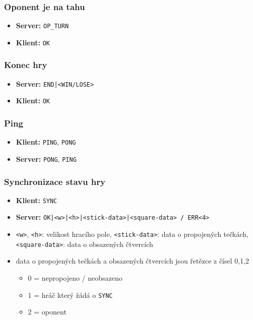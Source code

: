 \documentclass[11pt,a4paper]{article}
\begin{document}
\subsubsection*{Oponent je na tahu}
\begin{itemize}
	\item \textbf{Server:} \texttt{OP\_TURN}
	\item \textbf{Klient:} \texttt{OK}
\end{itemize}

\subsubsection*{Konec hry}
\begin{itemize}
	\item \textbf{Server:} \texttt{END|<WIN/LOSE>}
	\item \textbf{Klient:} \texttt{OK}
\end{itemize}

\subsubsection*{Ping}
\begin{itemize}
	\item \textbf{Klient:} \texttt{PING}, \texttt{PONG}
	\item \textbf{Server:} \texttt{PONG}, \texttt{PING}
\end{itemize}

\subsubsection*{Synchronizace stavu hry}
\begin{itemize}
	\item \textbf{Klient:} \texttt{SYNC}
	\item \textbf{Server:} \texttt{OK|<w>|<h>|<stick-data>|<square-data> / ERR<4>}
	\item \texttt{<w>}, \texttt{<h>}: velikost hracího pole, \texttt{<stick-data>}: data o propojených tečkách, \texttt{<square-data>}: data o obsazených čtvercích
	\item data o propojených tečkách a obsazených čtvercích jsou řetězce z čísel 0,1,2
	\begin{itemize}
		\item 0 = nepropojeno / neobsazeno
		\item 1 = hráč který žádá o \texttt{SYNC}
		\item 2 = oponent
	\end{itemize}
\end{itemize}
\end{document}
